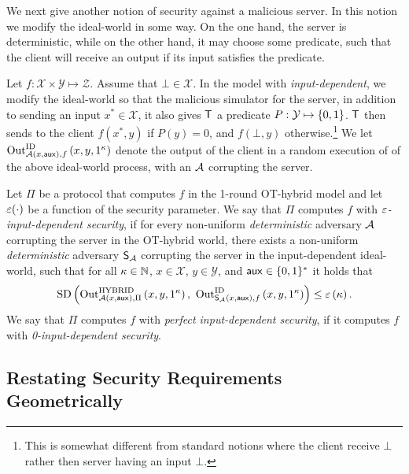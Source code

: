 \documentclass{llncs}
\newcommand{\X}{\mathcal{X}}
\newcommand{\Y}{\mathcal{Y}}
\renewcommand{\Z}{\mathcal{Z}}
\newcommand{\aux}{\mathsf{aux}}
\newcommand{\HYBRID}{\operatorname{HYBRID}}
\newcommand{\ID}{\operatorname{ID}}
\newcommand{\Out}{\operatorname{Out}}
\renewcommand{\SD}{\operatorname*{SD}}
\begin{document}
We next give another notion of security against a malicious server. In this notion we modify the ideal-world in some way. On the one hand, the server is deterministic, while on the other hand, it may choose some predicate, such that the client will receive an output if its input satisfies the predicate.%

\begin{definition}
Let $f:\X\times\Y\mapsto\Z$. Assume that $\bot\in\X$. %
In the model with \emph{input-dependent}, we modify the ideal-world so that the malicious simulator for the server, in addition to sending an input $x^*\in\X$, it also gives $\mathsf{T}$ a predicate $P:\Y\mapsto\zo$. $\mathsf{T}$ then sends to the client $f(x^*,y)$ if $P(y)=0$, and $f(\bot,y)$ otherwise.\footnote{This is somewhat different from standard notions where the client receive $\bot$ rather then server having an input $\bot$.} We let $\Out^{\ID}_{\adv\of{x,\aux},f}\of{x,y,1^{\kappa}}$ denote the output of the client in a random execution of of the above ideal-world process, with an $\mathcal{A}$ corrupting the server.

Let $\Pi$ be a protocol that computes $f$ in the 1-round OT-hybrid model and let $\varepsilon(\cdot)$ be a function of the security parameter. We say that $\Pi$ computes $f$ with \emph{$\varepsilon$-input-dependent security}, if for every non-uniform \emph{deterministic} adversary $\mathcal{A}$ corrupting the server in the OT-hybrid world, there exists a non-uniform \emph{deterministic} adversary $\mathsf{S}_{\mathcal{A}}$ corrupting the server in the input-dependent ideal-world, such that for all $\kappa\in{\mathbb{N}}$, $x\in\X$, $y\in\Y$, and $\aux\in\zo^*$ it holds that $$\SD\of{\Out^{\HYBRID}_{\adv\of{x,\aux},\Pi}\of{x,y,1^{\kappa}},~\Out^{\ID}_{\Sim_{\adv}\of{x,\aux},f}\of{x,y,1^{\kappa}}}\leq\eps\of{\kappa}.$$
We say that $\Pi$ computes $f$ with \emph{perfect input-dependent security}, if it computes $f$ with \emph{0-input-dependent security}.
\end{definition}

\subsection{Restating Security Requirements Geometrically}
\end{document}
